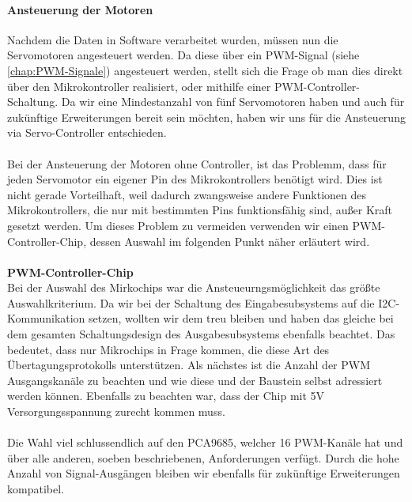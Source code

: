 \documentclass[titlepage,12pt,twoside]{article}
\begin{document}
\paragraph{Ansteuerung der Motoren}
\label{par:Ansteuerung der Motoren}
\hfill \break
\hfill \break
Nachdem die Daten in Software verarbeitet wurden, müssen nun die Servomotoren angesteuert werden. Da diese über ein PWM-Signal (siehe \autoref{chap:PWM-Signale})
angesteuert werden, stellt sich die Frage ob man dies direkt über den Mikrokontroller realisiert, oder mithilfe einer PWM-Controller-Schaltung.
Da wir eine Mindestanzahl von fünf Servomotoren haben und auch für zukünftige Erweiterungen bereit sein möchten, haben wir uns für die Ansteuerung
via Servo-Controller entschieden. \\
\\
Bei der Ansteuerung der Motoren ohne Controller, ist das Problemm, dass für jeden Servomotor ein eigener Pin des Mikrokontrollers benötigt wird.
Dies ist nicht gerade Vorteilhaft, weil dadurch zwangsweise andere Funktionen des Mikrokontrollers, die nur mit bestimmten Pins funktionsfähig sind,
außer Kraft gesetzt werden. Um dieses Problem zu vermeiden verwenden wir einen PWM-Controller-Chip, dessen Auswahl im folgenden Punkt näher erläutert wird. \\
\\
\textbf{PWM-Controller-Chip}
\\
Bei der Auswahl des Mirkochips war die Ansteueurngsmöglichkeit das größte Auswahlkriterium. Da wir bei der Schaltung des Eingabesubsystems
auf die I2C-Kommunikation setzen, wollten wir dem treu bleiben und haben das gleiche bei dem gesamten Schaltungsdesign des Ausgabesubsystems
ebenfalls beachtet. Das bedeutet, dass nur Mikrochips in Frage kommen, die diese Art des Übertagungsprotokolls unterstützen. Als nächstes
ist die Anzahl der PWM Ausgangskanäle zu beachten und wie diese und der Baustein selbst adressiert werden können. Ebenfalls zu beachten war,
dass der Chip mit 5V Versorgungsspannung zurecht kommen muss. \\
\\
Die Wahl viel schlussendlich auf den PCA9685, welcher 16 PWM-Kanäle hat und über alle anderen, soeben beschriebenen, Anforderungen verfügt.
Durch die hohe Anzahl von Signal-Ausgängen bleiben wir ebenfalls für zukünftige Erweiterungen kompatibel. \\
\\
\end{document}

